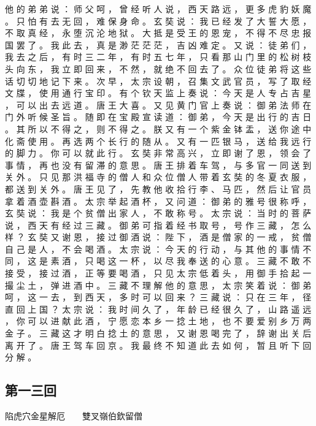 {他 的 弟 弟 说 ： 师 父 呵 ， 曾 经 听 人 说 ， 西 天 路 远 ， 更 多 虎 豹 妖 魔 。
只 怕 有 去 无 回 ， 难 保 身 命 。
玄 奘 说 ： 我 已 经 发 了 大 誓 大 愿 ， 不 取 真 经 ， 永 堕 沉 沦 地 狱 。
大 抵 是 受 王 的 恩 宠 ， 不 得 不 尽 忠 报 国 罢 了 。
我 此 去 ， 真 是 渺 茫 茫 茫 ， 吉 凶 难 定 。
又 说 ： 徒 弟 们 ， 我 去 之 后 ， 有 时 三 二 年 ， 有 时 五 七 年 ， 只 看 那 山 门 里 的 松 树 枝 头 向 东 ， 我 立 即 回 来 ， 不 然 ， 就 绝 不 回 去 了 。
众 位 徒 弟 将 这 些 话 切 切 地 记 下 来 。
次 早 ， 太 宗 设 朝 ， 召 集 文 武 官 员 ， 写 了 取 经 文 牒 ， 使 用 通 行 宝 印 。
有 个 钦 天 监 上 奏 说 ： 今 天 是 人 专 占 吉 星 ， 可 以 出 去 远 道 。
唐 王 大 喜 。
又 见 黄 门 官 上 奏 说 ： 御 弟 法 师 在 门 外 听 候 圣 旨 。
随 即 在 宝 殿 宣 读 道 ： 御 弟 ， 今 天 是 出 行 的 吉 日 。
其 所 以 不 得 之 ， 则 不 得 之 。
朕 又 有 一 个 紫 金 钵 盂 ， 送 你 途 中 化 斋 使 用 。
再 选 两 个 长 行 的 随 从 。
又 有 一 匹 银 马 ， 送 给 我 远 行 的 脚 力 。
你 可 以 就 此 行 。
玄 奘 非 常 高 兴 ， 立 即 谢 了 恩 ， 领 会 了 事 情 ， 再 也 没 有 留 滞 的 意 思 。
唐 王 排 着 车 驾 ， 与 多 官 一 同 送 到 关 外 。
只 见 那 洪 福 寺 的 僧 人 和 众 位 僧 人 带 着 玄 奘 的 冬 夏 衣 服 ， 都 送 到 关 外 。
唐 王 见 了 ， 先 教 他 收 拾 行 李 、 马 匹 ， 然 后 让 官 员 拿 着 酒 壶 斟 酒 。
太 宗 举 起 酒 杯 ， 又 问 道 ： 御 弟 的 雅 号 很 称 呼 ， 玄 奘 说 ： 我 是 个 贫 僧 出 家 人 ， 不 敢 称 号 。
太 宗 说 ： 当 时 的 菩 萨 说 ， 西 天 有 经 过 三 藏 。
御 弟 可 指 着 经 书 取 号 ， 号 作 三 藏 ， 怎 么 样 ？ 玄 奘 又 谢 恩 ， 接 过 御 酒 说 ： 陛 下 ， 酒 是 僧 家 的 一 戒 ， 贫 僧 自 己 是 人 ， 不 会 喝 酒 。
太 宗 说 ： 今 天 的 行 动 ， 与 其 他 的 事 情 不 同 ， 这 是 素 酒 ， 只 喝 这 一 杯 ， 以 尽 我 奉 送 的 心 意 。
三 藏 不 敢 不 接 受 ， 接 过 酒 ， 正 等 要 喝 酒 ， 只 见 太 宗 低 着 头 ， 用 御 手 拾 起 一 撮 尘 土 ， 弹 进 酒 中 。
三 藏 不 理 解 他 的 意 思 ， 太 宗 笑 着 说 ： 御 弟 呵 ， 这 一 去 ， 到 西 天 ， 多 时 可 以 回 来 ？ 三 藏 说 ： 只 在 三 年 ， 径 直 回 上 国 ？
太 宗 说 ： 我 时 间 久 了 ， 年 龄 已 经 很 久 了 ， 山 路 遥 远 ， 你 可 以 进 献 此 酒 ， 宁 愿 恋 本 乡 一 捻 土 地 ， 也 不 要 爱 别 乡 万 两 金 子 。
三 藏 这 才 明 白 捻 土 的 意 思 ， 又 谢 恩 喝 完 了 ， 辞 谢 出 关 后 离 开 了 。
唐 王 驾 车 回 京 。
我 最 终 不 知 道 此 去 如 何 ， 暂 且 听 下 回 分 解 。
}\switchcolumn\flushpage  \begin{pinyinscope}{\myfontt \section{第一三回}     陷虎穴金星解厄　　雙叉嶺伯欽留僧

}
\end{pinyinscope}

